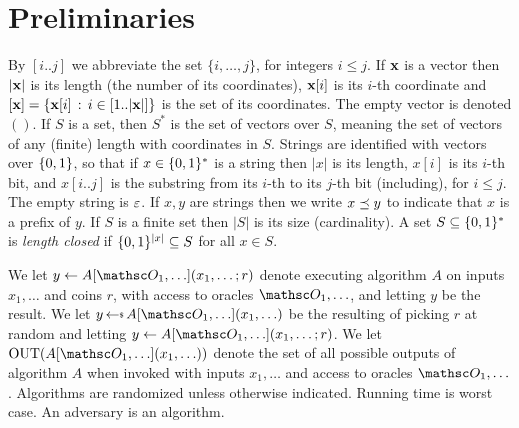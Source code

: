 
\section{Preliminaries}\label{sec-prelims}


 By $[i..j]$ we abbreviate the set $\{i,\ldots,j\}$, for integers $i \leq j$. If $\mathbf{x}$ is a vector then $|\mathbf{x}|$ is its length (the number of its coordinates), $\mathbf{x}[i]$ is its $i$-th coordinate and $[\mathbf{x}]=\{\mathbf{x}[i] \,:\, i\in [1..|\mathbf{x}|]\}$ is the set of its coordinates. The empty vector is denoted $()$. If $S$ is a set, then $S^*$ is the set of vectors over $S$, meaning the set of vectors of any (finite) length with coordinates in $S$. Strings are identified with vectors over $\{0,1\}$, so that if $x \in \{0,1\}^*$ is a string then $|x|$ is its length, $x[i]$ is its $i$-th bit, and $x[i..j]$ is the substring from its $i$-th to its $j$-th bit (including), for $i \leq j$. The empty string is $\varepsilon$.  
If $x,y$ are strings then we write $x \preceq y$ to indicate that $x$ is a prefix of $y$. If $S$ is a finite set then $|S|$ is its size (cardinality). A set $S\subseteq\{0,1\}^*$ is \textit{length closed} if $\{0,1\}^{|x|}\subseteq S$ for all $x\in S$. 

We let $y \gets A[\Oracle_1, \ldots](x_1,\ldots ; r)$ denote executing algorithm $A$ on inputs $x_1,\ldots$ and coins $r$, with access to oracles $\Oracle_1, \ldots$, and letting $y$ be the result. We let $y \getsr A[\Oracle_1, \ldots ](x_1,\ldots)$ be the resulting of picking $r$ at random and letting $y \gets A[\Oracle_1, \ldots ](x_1,\ldots;r)$. We let $\algOutput(A[\Oracle_1, \ldots ](x_1,\ldots))$ denote the set of all possible outputs of algorithm $A$ when invoked with inputs $x_1,\ldots$ and access to oracles $\Oracle_1, \ldots$. Algorithms are randomized unless otherwise indicated. Running time is worst case.
An adversary is an algorithm.

